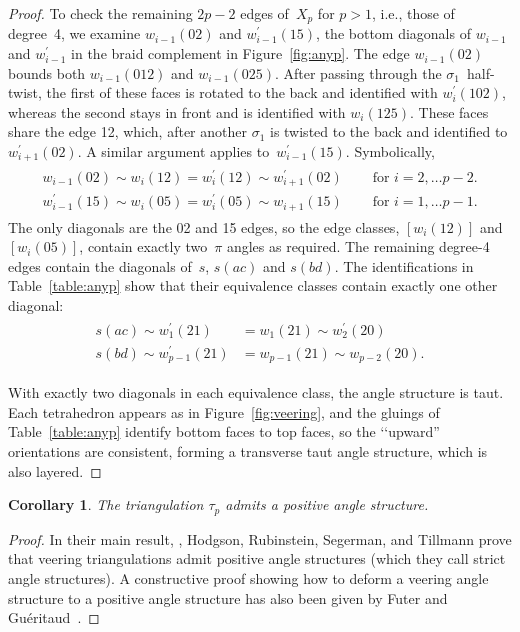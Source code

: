 \documentclass[reqno]{amsart}
\theoremstyle{plain}
\newtheorem{cor}[thm]{Corollary}
\theoremstyle{definition}
\begin{document}
\begin{proof}
To check the remaining $2p-2$ edges of~$X_{p}$ for $p>1$, i.e., those of degree~4, we examine $w_{i-1}(02)$ and $w_{i-1}^\prime(15)$, the bottom diagonals of $w_{i-1}$ and $w_{i-1}^\prime$ in the braid complement in Figure~\ref{fig:anyp}.  The edge $w_{i-1}(02)$ bounds both $w_{i-1}(012)$ and $w_{i-1}(025)$.  After passing through the $\sigma_1$~half-twist, the first of these faces is rotated to the back and identified with $w_{i}^\prime(102)$, whereas the second stays in front and is identified with $w_{i}(125)$.  These faces share the edge 12, which, after another $\sigma_1$ is twisted to the back and identified to $w_{i+1}^\prime(02)$.  A similar argument applies to~$w_{i-1}^\prime(15)$.  Symbolically,
\begin{align} 
\begin{split}\label{eq:deg4}
w_{i-1}(02)\sim w_{i}(12)= w_{i}^\prime(12)\sim w_{i+1}^\prime(02)\quad  &\text{ for } i=2, \dots p-2.\\
w_{i-1}^\prime(15)\sim w_{i}(05)=w_{i}^\prime(05)\sim w_{i+1}(15)\quad	&\text{ for } i=1, \dots p-1.
\end{split}
\end{align}
The only diagonals are the 02 and 15 edges, so the edge classes, $[w_i(12)]$ and $[w_i(05)]$, contain exactly two~$\pi$ angles as required.  The remaining  degree-4 edges contain the diagonals of~$s$, $s(ac)$ and $s(bd)$.  The identifications in Table~\ref{table:anyp} show that their equivalence classes contain exactly one other diagonal:
\begin{align} 
\begin{split}\label{eq:s}
s(ac)	\sim w_1^\prime(21) &= w_1(21) 	\sim w_2^\prime(20) \\ 
s(bd)	\sim w_{p-1}^\prime(21) &= w_{p-1}(21) 	\sim w_{p-2}(20).
\end{split}
\end{align}

With exactly two diagonals in each equivalence class, the angle structure is taut.  Each tetrahedron appears as in Figure~\ref{fig:veering}, and the gluings of Table~\ref{table:anyp} identify bottom faces to top faces, so the \lq\lq upward'' orientations are consistent, forming a transverse taut angle structure, which is also layered.
\end{proof}

\begin{cor}\label{cor:positiveanglestructure}
The triangulation $\tau_{p}$ admits a positive angle structure.
\end{cor}
\begin{proof}
In their main result, \cite[Theorem 1.5]{HodgsonEtal}, Hodgson, Rubinstein, Segerman, and Tillmann prove that veering triangulations admit positive angle structures (which they call strict angle structures).  A constructive proof showing how to deform a veering angle structure to a positive angle structure has also been given by Futer and Gu\'eritaud~\cite[Theorem 1.3]{veering}.
\end{proof}
\end{document}
